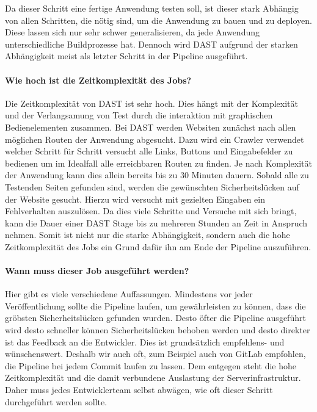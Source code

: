 Da dieser Schritt eine fertige Anwendung testen soll, ist dieser stark Abhängig von allen Schritten, die nötig sind, um die Anwendung zu bauen und zu deployen.
Diese lassen sich nur sehr schwer generalisieren, da jede Anwendung unterschiedliche Buildprozesse hat.
Dennoch wird DAST aufgrund der starken Abhängigkeit meist als letzter Schritt in der Pipeline ausgeführt.

\paragraph{Wie hoch ist die Zeitkomplexität des Jobs?}

Die Zeitkomplexität von DAST ist sehr hoch.
Dies hängt mit der Komplexität und der Verlangsamung von Test durch die interaktion mit graphischen Bedienelementen zusammen.
Bei DAST werden Websiten zunächst nach allen möglichen Routen der Anwendung abgesucht.
Dazu wird ein Crawler verwendet welcher Schritt für Schritt versucht alle Links, Buttons und Eingabefelder zu bedienen um im Idealfall alle erreichbaren Routen zu finden.
Je nach Komplexität der Anwendung kann dies allein bereits bis zu 30 Minuten dauern.
Sobald alle zu Testenden Seiten gefunden sind, werden die gewünschten Sicherheitslücken auf der Website gesucht.
Hierzu wird versucht mit gezielten Eingaben ein Fehlverhalten auszulösen.
Da dies viele Schritte und Versuche mit sich bringt, kann die Dauer einer DAST Stage bis zu mehreren Stunden an Zeit in Anspruch nehmen.
Somit ist nicht nur die starke Abhängigkeit, sondern auch die hohe Zeitkomplexität des Jobs ein Grund dafür ihn am Ende der Pipeline auszuführen.

\paragraph{Wann muss dieser Job ausgeführt werden?}

Hier gibt es viele verschiedene Auffassungen.
Mindestens vor jeder Veröffentlichung sollte die Pipeline laufen, um gewährleisten zu können, dass die gröbsten Sicherheitslücken gefunden wurden.
Desto öfter die Pipeline ausgeführt wird desto schneller können Sicherheitslücken behoben werden und desto direkter ist das Feedback an die Entwickler.
Dies ist grundsätzlich empfehlens- und wünschenswert.
Deshalb wir auch oft, zum Beispiel auch von GitLab empfohlen, die Pipeline bei jedem Commit laufen zu lassen.\cite{gitlabSeismicShiftApplication2020}
Dem entgegen steht die hohe Zeitkomplexität und die damit verbundene Auslastung der Serverinfrastruktur.
Daher muss jedes Entwicklerteam selbst abwägen, wie oft dieser Schritt durchgeführt werden sollte.


